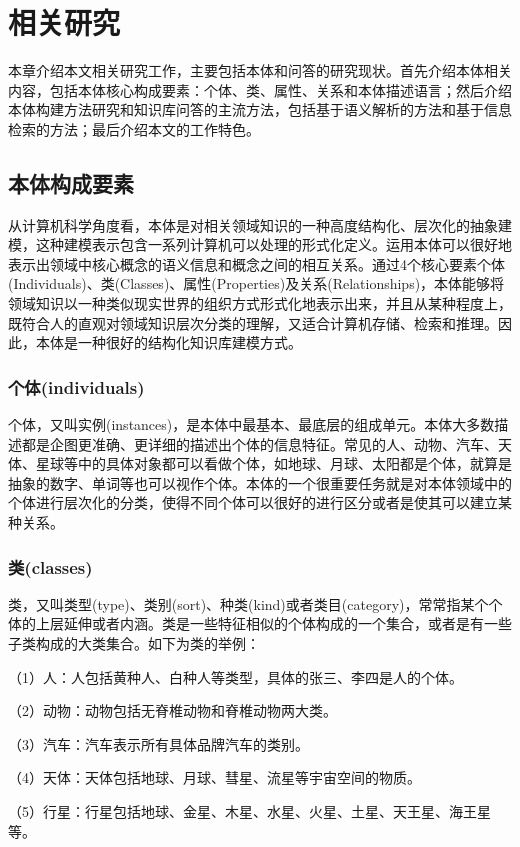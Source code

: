 \chapter{相关研究}
本章介绍本文相关研究工作，主要包括本体和问答的研究现状。首先介绍本体相关内容，包括本体核心构成要素：个体、类、属性、关系和本体描述语言；然后介绍本体构建方法研究和知识库问答的主流方法，包括基于语义解析的方法和基于信息检索的方法；最后介绍本文的工作特色。

\section{本体构成要素}
从计算机科学角度看，本体是对相关领域知识的一种高度结构化、层次化的抽象建模，这种建模表示包含一系列计算机可以处理的形式化定义\cite{Hitzler}。运用本体可以很好地表示出领域中核心概念的语义信息和概念之间的相互关系。通过4个核心要素个体(Individuals)、类(Classes)、属性(Properties)及关系(Relationships)，本体能够将领域知识以一种类似现实世界的组织方式形式化地表示出来，并且从某种程度上，既符合人的直观对领域知识层次分类的理解，又适合计算机存储、检索和推理。因此，本体是一种很好的结构化知识库建模方式。

\subsection{个体(individuals)}
个体，又叫实例(instances)，是本体中最基本、最底层的组成单元。本体大多数描述都是企图更准确、更详细的描述出个体的信息特征。常见的人、动物、汽车、天体、星球等中的具体对象都可以看做个体，如地球、月球、太阳都是个体，就算是抽象的数字、单词等也可以视作个体。本体的一个很重要任务就是对本体领域中的个体进行层次化的分类，使得不同个体可以很好的进行区分或者是使其可以建立某种关系。

\subsection{类(classes)}
类，又叫类型(type)、类别(sort)、种类(kind)或者类目(category)，常常指某个个体的上层延伸或者内涵。类是一些特征相似的个体构成的一个集合，或者是有一些子类构成的大类集合。如下为类的举例：

（1）人：人包括黄种人、白种人等类型，具体的张三、李四是人的个体。

（2）动物：动物包括无脊椎动物和脊椎动物两大类。

（3）汽车：汽车表示所有具体品牌汽车的类别。

（4）天体：天体包括地球、月球、彗星、流星等宇宙空间的物质。

（5）行星：行星包括地球、金星、木星、水星、火星、土星、天王星、海王星等。

